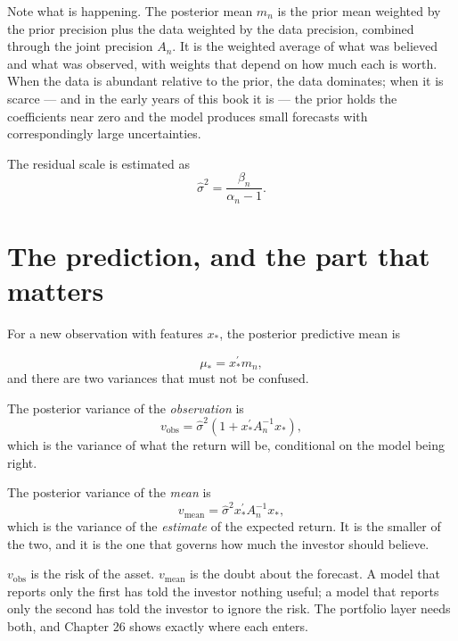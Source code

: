 Note what is happening. The posterior mean \(m_n\) is the prior mean
weighted by the prior precision plus the data weighted by the data
precision, combined through the joint precision \(A_n\). It is the
weighted average of what was believed and what was observed, with weights
that depend on how much each is worth. When the data is abundant relative
to the prior, the data dominates; when it is scarce --- and in the early
years of this book it is --- the prior holds the coefficients near zero
and the model produces small forecasts with correspondingly large
uncertainties.

The residual scale is estimated as
\begin{equation}
\hat{\sigma}^2 = \frac{\beta_n}{\alpha_n - 1}.
\end{equation}

\section{The prediction, and the part that matters}

For a new observation with features \(x_*\), the posterior predictive
mean is

\begin{equation}
\mu_* = x_*^{\prime} m_n,
\end{equation}
and there are two variances that must not be confused.

The posterior variance of the \emph{observation} is
\begin{equation}
v_{\mathrm{obs}} = \hat{\sigma}^2\left(1 + x_*^{\prime}A_n^{-1}x_*\right),
\end{equation}
which is the variance of what the return will be, conditional on the
model being right.

The posterior variance of the \emph{mean} is
\begin{equation}
v_{\mathrm{mean}} = \hat{\sigma}^2 x_*^{\prime}A_n^{-1}x_*,
\end{equation}
which is the variance of the \emph{estimate} of the expected return. It is
the smaller of the two, and it is the one that governs how much the
investor should believe.

\begin{takeaway}
\(v_{\mathrm{obs}}\) is the risk of the asset. \(v_{\mathrm{mean}}\) is the
doubt about the forecast. A model that reports only the first has told
the investor nothing useful; a model that reports only the second has
told the investor to ignore the risk. The portfolio layer needs both, and
Chapter 26 shows exactly where each enters.
\end{takeaway}

